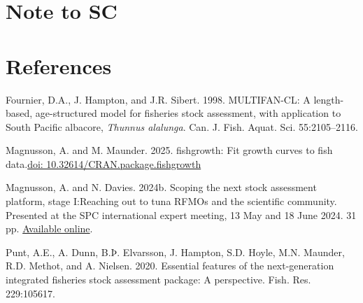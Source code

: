 \documentclass{SCreport}
\newcommand\blob
{https://github.com/PacificCommunity/ofp-sam-transition-plan/blob/main}
\newcommand\present{\blob/presentations}
\begin{document}
\section{Note to SC}

\section{References}

\sloppy\setlength{}

\begin{description}\setlength\itemsep{0ex}
  \item Fournier, D.A., J. Hampton, and J.R. Sibert. 1998. MULTIFAN-CL: A
  length-based, age-structured model for fisheries stock assessment, with
  application to South Pacific albacore, \textit{Thunnus alalunga}. Can. J.
  Fish. Aquat. Sci. 55:2105--2116.
  \item Magnusson, A. and M. Maunder. 2025. fishgrowth: Fit growth curves to
  fish data.\linebreak \href{https://doi.org/10.32614/CRAN.package.fishgrowth}
  {doi: 10.32614/CRAN.package.fishgrowth}
  \item Magnusson, A. and N. Davies. 2024b. Scoping the next stock assessment
  platform, stage I:\linebreak Reaching out to tuna RFMOs and the scientific
  community. Presented at the SPC international expert meeting, 13 May and 18
  June 2024. 31 pp.
  \href{\present/2024_05_13_experts_scoping/2024_05_13_experts_scoping.pdf}
  {Available online}.
  \item Punt, A.E., A. Dunn, B.Þ. Elvarsson, J. Hampton, S.D. Hoyle, M.N.
  Maunder, R.D. Methot, and A. Nielsen. 2020. Essential features of the
  next-generation integrated fisheries stock assessment package: A perspective.
  Fish. Res. 229:105617.
\end{description}
\end{document}
